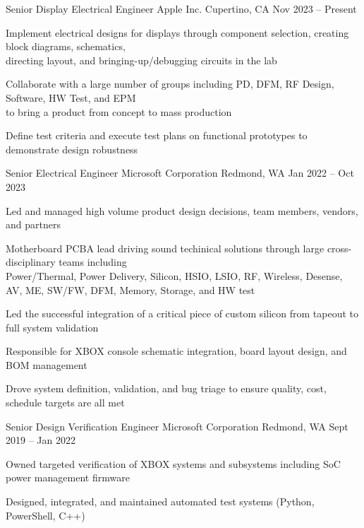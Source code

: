 \documentclass[]{awesome-cv}
\begin{document}
\begin{cventries}
	\cventry
	{Senior Display Electrical Engineer}
	{Apple Inc.}
	{Cupertino, CA}
	{Nov 2023 – Present}
	{\begin{cvitems}
  \item {Implement electrical designs for displays through component selection, creating block diagrams, schematics, \\
     directing layout, and bringing-up/debugging circuits in the lab}
  \item {Collaborate with a large number of groups including PD, DFM, RF Design, Software, HW Test, and EPM \\
     to bring a product from concept to mass production}
  \item {Define test criteria and execute test plans on functional prototypes to demonstrate design robustness}
	\end{cvitems}}
	\cventry
	{Senior Electrical Engineer}
	{Microsoft Corporation}
	{Redmond, WA}
	{Jan 2022 – Oct 2023}
	{\begin{cvitems}
 	\item {Led and managed high volume product design decisions, team members, vendors, and partners}
		\item {Motherboard PCBA lead driving sound techinical solutions through large cross-disciplinary teams including \\ 
  			Power/Thermal, Power Delivery, Silicon, HSIO, LSIO, RF, Wireless, Desense, AV, ME, SW/FW, DFM, Memory, Storage, and HW test}
		\item {Led the successful integration of a critical piece of custom silicon from tapeout to full system validation}
		\item {Responsible for XBOX console schematic integration, board layout design, and BOM management}
		\item {Drove system definition, validation, and bug triage to ensure quality, cost, schedule targets are all met}
	\end{cvitems}}
	\cventry
	{Senior Design Verification Engineer}
	{Microsoft Corporation}
	{Redmond, WA}
	{Sept 2019 – Jan 2022}
	{\begin{cvitems}
		\item {Owned targeted verification of XBOX systems and subsystems including SoC power management firmware}
		\item {Designed, integrated, and maintained automated test systems (Python, PowerShell, C++)}

\end{cvitems}}
\end{cventries}
\end{document}
